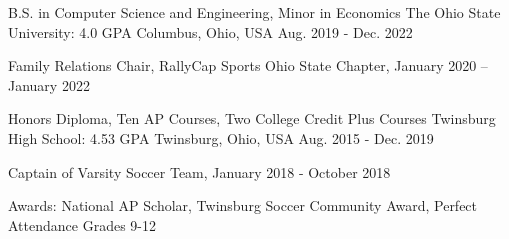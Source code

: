 

\begin{cventries}

  \cventry
    {B.S. in Computer Science and Engineering, Minor in Economics} %
    {The Ohio State University: 4.0 GPA} %
    {Columbus, Ohio, USA} %
    {Aug. 2019 - Dec. 2022} %
    {
      \begin{cvitems} %
        \item{Family Relations Chair, RallyCap Sports Ohio State Chapter, January 2020 – January 2022}
      \end{cvitems}
    }
    
    \cventry
    {Honors Diploma, Ten AP Courses, Two College Credit Plus Courses} %
    {Twinsburg High School: 4.53 GPA} %
    {Twinsburg, Ohio, USA} %
    {Aug. 2015 - Dec. 2019} %
    {
      \begin{cvitems} %
        \item{Captain of Varsity Soccer Team, January 2018 - October 2018}
        \item{Awards: National AP Scholar, Twinsburg Soccer Community Award, Perfect Attendance Grades 9-12} 
      \end{cvitems}
    }

\end{cventries}
